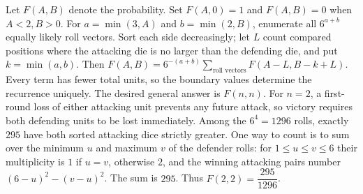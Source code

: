 Let $F(A,B)$ denote the probability. Set $F(A,0)=1$ and $F(A,B)=0$ when $A<2,B>0$. For $a=\min(3,A)$ and $b=\min(2,B)$, enumerate all $6^{a+b}$ equally likely roll vectors. Sort each side decreasingly; let $L$ count compared positions where the attacking die is no larger than the defending die, and put $k=\min(a,b)$. Then $F(A,B)=6^{-(a+b)}\sum_{\text{roll vectors}}F(A-L,B-k+L)$. Every term has fewer total units, so the boundary values determine the recurrence uniquely. The desired general answer is $F(n,n)$. For $n=2$, a first-round loss of either attacking unit prevents any future attack, so victory requires both defending units to be lost immediately. Among the $6^4=1296$ rolls, exactly $295$ have both sorted attacking dice strictly greater. One way to count is to sum over the minimum $u$ and maximum $v$ of the defender rolls: for $1\le u\le v\le6$ their multiplicity is $1$ if $u=v$, otherwise $2$, and the winning attacking pairs number $(6-u)^2-(v-u)^2$. The sum is $295$. Thus $\boxed{F(2,2)=\dfrac{295}{1296}}$.
